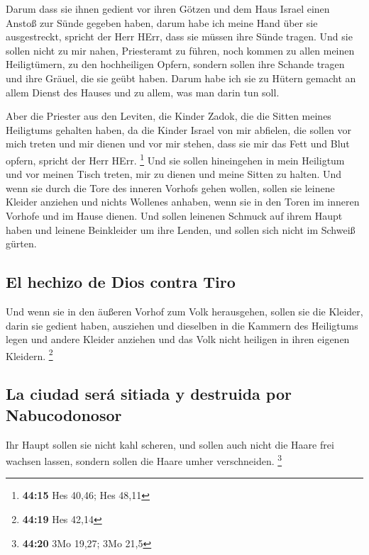  Darum dass sie ihnen gedient vor ihren Götzen und dem
Haus Israel einen Anstoß zur Sünde gegeben haben, darum habe ich meine
Hand über sie ausgestreckt, spricht der Herr HErr, dass sie müssen ihre
Sünde tragen.  Und sie sollen nicht zu mir nahen,
Priesteramt zu führen, noch kommen zu allen meinen Heiligtümern, zu den
hochheiligen Opfern, sondern sollen ihre Schande tragen und ihre Gräuel,
die sie geübt haben.  Darum habe ich sie zu Hütern
gemacht an allem Dienst des Hauses und zu allem, was man darin tun soll.

 Aber die Priester aus den Leviten, die Kinder Zadok, die
die Sitten meines Heiligtums gehalten haben, da die Kinder Israel von
mir abfielen, die sollen vor mich treten und mir dienen und vor mir
stehen, dass sie mir das Fett und Blut opfern, spricht der Herr HErr.
\footnote{\textbf{44:15} Hes 40,46; Hes 48,11}  Und sie
sollen hineingehen in mein Heiligtum und vor meinen Tisch treten, mir zu
dienen und meine Sitten zu halten.  Und wenn sie durch
die Tore des inneren Vorhofs gehen wollen, sollen sie leinene Kleider
anziehen und nichts Wollenes anhaben, wenn sie in den Toren im inneren
Vorhofe und im Hause dienen.  Und sollen leinenen Schmuck
auf ihrem Haupt haben und leinene Beinkleider um ihre Lenden, und sollen
sich nicht im Schweiß gürten.

\hypertarget{el-hechizo-de-dios-contra-tiro}{%
\subsection{El hechizo de Dios contra
Tiro}\label{el-hechizo-de-dios-contra-tiro}}

 Und wenn sie in den äußeren Vorhof zum Volk herausgehen,
sollen sie die Kleider, darin sie gedient haben, ausziehen und dieselben
in die Kammern des Heiligtums legen und andere Kleider anziehen und das
Volk nicht heiligen in ihren eigenen Kleidern. \footnote{\textbf{44:19}
  Hes 42,14}

\hypertarget{la-ciudad-seruxe1-sitiada-y-destruida-por-nabucodonosor}{%
\subsection{La ciudad será sitiada y destruida por
Nabucodonosor}\label{la-ciudad-seruxe1-sitiada-y-destruida-por-nabucodonosor}}

 Ihr Haupt sollen sie nicht kahl scheren, und sollen auch
nicht die Haare frei wachsen lassen, sondern sollen die Haare umher
verschneiden. \footnote{\textbf{44:20} 3Mo 19,27; 3Mo 21,5}

